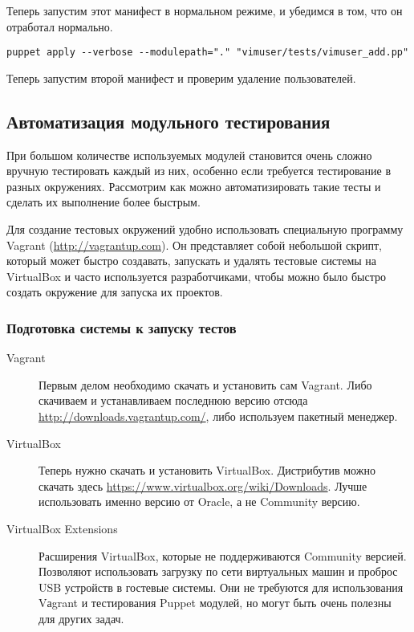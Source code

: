 Теперь запустим этот манифест в нормальном режиме, и убедимся в том, что он отработал нормально.

\begin{verbatim}
puppet apply --verbose --modulepath="." "vimuser/tests/vimuser_add.pp"
\end{verbatim}


Теперь запустим второй манифест и проверим удаление пользователей.


\subsection{Автоматизация модульного тестирования}

При большом количестве используемых модулей становится очень сложно вручную тестировать каждый из них, особенно если требуется тестирование в разных окружениях. Рассмотрим как можно автоматизировать такие тесты и сделать их выполнение более быстрым.

Для создание тестовых окружений удобно использовать специальную программу Vagrant (\url{http://vagrantup.com}). Он представляет собой небольшой скрипт, который может быстро создавать, запускать и удалять тестовые системы на VirtualBox и часто используется разработчиками, чтобы можно было быстро создать окружение для запуска их проектов.

\subsubsection{Подготовка системы к запуску тестов}

\begin{description}
\item[Vagrant] Первым делом необходимо скачать и установить сам Vagrant. Либо скачиваем и устанавливаем последнюю версию отсюда \url{http://downloads.vagrantup.com/}, либо используем пакетный менеджер.
\item[VirtualBox] Теперь нужно скачать и установить VirtualBox. Дистрибутив можно скачать здесь \url{https://www.virtualbox.org/wiki/Downloads}. Лучше использовать именно версию от Oracle, а не Community версию.
\item[VirtualBox Extensions] Расширения VirtualBox, которые не поддерживаются Community версией. Позволяют использовать загрузку по сети виртуальных машин и проброс USB устройств в гостевые системы. Они не требуются для использования Vаgrant и тестирования Puppet модулей, но могут быть очень полезны для других задач.
\end{description}

